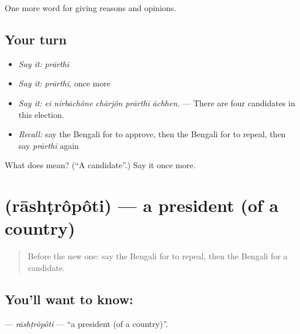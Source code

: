 \begin{grammarlens}[title={What you've built}]
One more word for giving reasons and opinions.
\end{grammarlens}

\subsection*{Your turn}
\begin{itemize}
\raggedright
  \item \emph{Say it:} \emph{prārthī}
  \item \emph{Say it:} \emph{prārthī}, once more
  \item \emph{Say it:} \emph{ei nirbāchône chārjôn prārthī āchhen.} — There are four candidates in this election.
  \item \emph{Recall:} say the Bengali for to approve, then the Bengali for to repeal, then say \emph{prārthī} again
\end{itemize}

\begin{tcolorbox}[breakable,colback=teal!4,colframe=teal!35!black,title={Before you move on}]
What does  mean? (\textquotedblleft{}A candidate\textquotedblright{}.) Say it once more.
\end{tcolorbox}
\section[\texorpdfstring{\bn{রাষ্ট্রপতি} (rāshṭrôpôti)}{রাষ্ট্রপতি (rāshṭrôpôti)}]{ (rāshṭrôpôti) — a president (of a country)}

\label{lesson:BN-C346-rashtropoti}



\begin{quote}
Before the new one: say the Bengali for to repeal, then the Bengali for a candidate.
\end{quote}

\subsection*{You'll want to know: }
\textbf{} — \emph{rāshṭrôpôti} — \textquotedblleft{}a president (of a country)\textquotedblright{}.

\begin{quote}
   
\end{quote}

